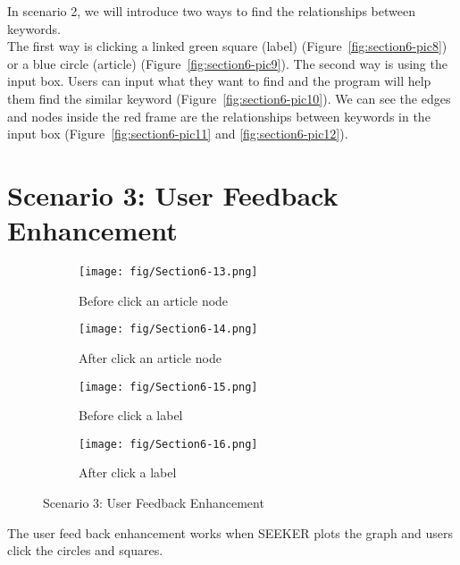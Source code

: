 \vspace{-25pt}
In scenario 2, we will introduce two ways to find the relationships between keywords.\\
The first way is clicking a linked green square (label) (Figure~\ref{fig:section6-pic8}) or a blue circle (article) (Figure~\ref{fig:section6-pic9}).
The second way is using the input box. Users can input what they want to find and the program will help them find the similar keyword (Figure~\ref{fig:section6-pic10}). We can see the edges and nodes inside the red frame are the relationships between keywords in the input box (Figure~\ref{fig:section6-pic11} and \ref{fig:section6-pic12}).

\section{Scenario 3: User Feedback Enhancement}
\begin{figure*}[!htb]
	\centering
	\begin{subfigure}{0.47\textwidth}
		\texttt{[image: fig/Section6-13.png]}
		\caption{Before click an article node} 
		\label{fig:section6-pic13}
	\end{subfigure}
	\hspace*{\fill} %
	\begin{subfigure}{0.47\textwidth}
		\texttt{[image: fig/Section6-14.png]}
		\caption{After click an article node} \label{fig:section6-pic14}
	\end{subfigure}
	\vspace{10pt}
	\begin{subfigure}{0.47\textwidth}
		\texttt{[image: fig/Section6-15.png]}
		\caption{Before click a label} \label{fig:section6-pic15}
	\end{subfigure}
	\hspace*{\fill} %
	\begin{subfigure}{0.47\textwidth}
		\texttt{[image: fig/Section6-16.png]}
		\caption{After click a label} 
		\label{fig:section6-pic16}
	\end{subfigure}
	\vspace{-10pt}
	\caption{Scenario 3: User Feedback Enhancement} \label{fig:section6-pic101112}
\end{figure*}
\vspace{-25pt}
The user feed back enhancement works when SEEKER plots the graph and users click the circles and squares.\\
